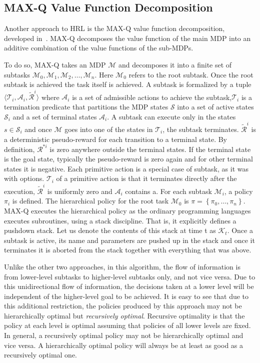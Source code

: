\subsection{MAX-Q Value Function Decomposition}
Another approach to HRL is the MAX-Q value function decomposition, developed in~\cite{Dietterich2000HierarchicalRL}. MAX-Q decomposes the value function of the main MDP into an additive combination of the value functions of the sub-MDPs.

To do so, MAX-Q takes an MDP $\mathcal{M}$ and decomposes it into a finite set of subtasks ${\mathcal{M}_0, \mathcal{M}_1, \mathcal{M}_2,\dotsc,\mathcal{M}_n}$. Here $\mathcal{M}_0$ refers to the root subtask. Once the root subtask is achieved the task itself is achieved. A subtask is formalized by a tuple $\langle \mathcal{T}_i, \mathcal{A}_i, \tilde{\mathcal{R}}^{i}\rangle$ where $\mathcal{A}_i$ is a set of admissible actions to achieve the subtask,$\mathcal{T}_i$ is a termination predicate that partitions the MDP states $\mathcal{S}$ into a set of active states $\mathcal{S}_i$ and a set of terminal states $\mathcal{A}_i$. A subtask can execute only in the states $s\in\mathcal{S}_i$ and once $\mathcal{M}$ goes into one of the states in $\mathcal{T}_i$, the subtask terminates. $\tilde{\mathcal{R}}^{i}$ is a deterministic pseudo-reward for each transition to a terminal state. By definition, $\mathcal{R}^{*i}$ is zero anywhere outside the terminal states. If the terminal state is the goal state, typically the pseudo-reward is zero again and for other terminal states it is negative. Each primitive action is a special case of subtask, as it was with options. $\mathcal{T}_i$ of a primitive action is that it terminates directly after the execution, $\tilde{\mathcal{R}}^{i}$ is uniformly zero and $\mathcal{A}_i$ contains a. For each subtask $\mathcal{M}_i$, a policy $\pi_i$ is defined. The hierarchical policy for the root task $\mathcal{M}_0$ is $\pi = \left\{\pi_0,\dotsc, \pi_n\right\}$. MAX-Q executes the hierarchical policy as the ordinary programming languages executes subroutines, using a stack discipline. That is, it explicitly defines a pushdown stack. Let us denote the contents of this stack at time t as $\mathcal{K}_t$. Once a subtask is active, its name and parameters are pushed up in the stack and once it terminates it is aborted from the stack together with everything that was above. 

Unlike the other two approaches, in this algorithm, the flow of information is from lower-level subtasks to higher-level subtasks only, and not vice versa. Due to this unidirectional flow of information, the decisions taken at a lower level will be independent of the higher-level goal to be achieved. It is easy to see that due to this additional restriction, the policies produced by this approach may not be hierarchically optimal but \textit{recursively optimal}. Recursive optimality is that the policy at each level is optimal assuming that policies of all lower levels are fixed. In general, a recursively optimal policy may not be hierarchically optimal and vice versa. A hierarchically optimal policy will always be at least as good as a recursively optimal one.

